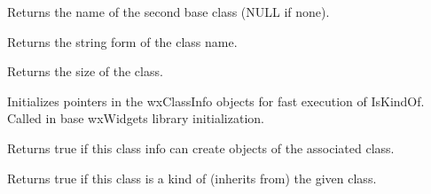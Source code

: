 \label{wxclassinfogetbaseclassname2}


Returns the name of the second base class (NULL if none).

\label{wxclassinfogetclassname}


Returns the string form of the class name.

\label{wxclassinfogetsize}


Returns the size of the class.

\label{wxclassinfoinitializeclasses}


Initializes pointers in the wxClassInfo objects for fast execution
of IsKindOf. Called in base wxWidgets library initialization.

\label{wxclassinfoisdynamic}


Returns true if this class info can create objects of the associated class.

\label{wxclassinfoiskindof}


Returns true if this class is a kind of (inherits from) the given class.


